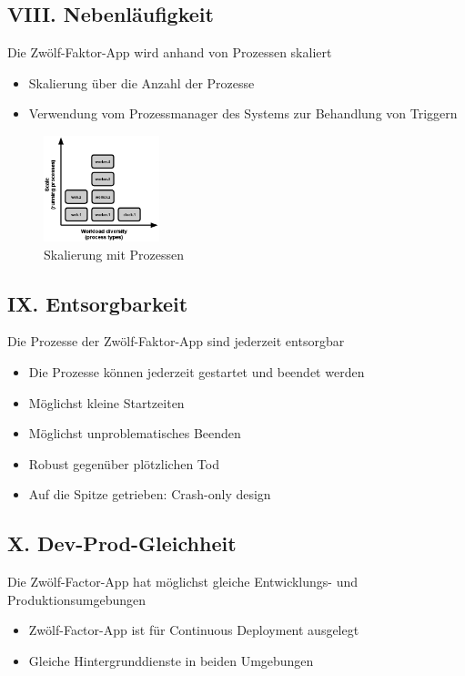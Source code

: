 \documentclass[fleqn,10pt]{SelfArx} %
\begin{document}
\subsection{VIII. Nebenläufigkeit}
Die Zwölf-Faktor-App wird anhand von Prozessen skaliert
\begin{itemize}
	\item Skalierung über die Anzahl der Prozesse
	\item Verwendung vom Prozessmanager des Systems zur Behandlung \newline von Triggern
\end{itemize}
\begin{figure}[htpb]
	\centering
	\includegraphics[width=0.3\textwidth]{../process-types.png}
	\caption{Skalierung mit Prozessen~\cite{factor-concurrency}}
\end{figure}
\subsection{IX. Entsorgbarkeit}
Die Prozesse der Zwölf-Faktor-App sind jederzeit entsorgbar
\begin{itemize}
	\item Die Prozesse können jederzeit gestartet und beendet werden
	\item Möglichst kleine Startzeiten
	\item Möglichst unproblematisches Beenden
	\item Robust gegenüber plötzlichen Tod
	\item Auf die Spitze getrieben: Crash-only design
\end{itemize}
\subsection{X. Dev-Prod-Gleichheit}
Die Zwölf-Factor-App hat möglichst gleiche Entwicklungs- und Produktionsumgebungen
\begin{itemize}
	\item Zwölf-Factor-App ist für Continuous Deployment ausgelegt
	\item Gleiche Hintergrunddienste in beiden Umgebungen
\end{itemize}
\end{document}
